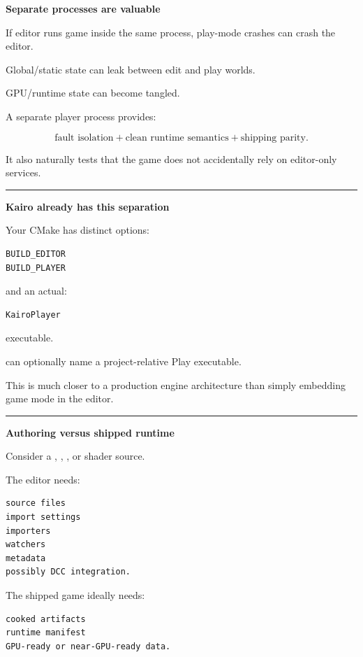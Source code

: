 \textbf{Separate processes are valuable}

If editor runs game inside the same process, play-mode crashes can crash the editor.

Global/static state can leak between edit and play worlds.

GPU/runtime state can become tangled.

A separate player process provides:

\[
\boxed{
\text{fault isolation}
+
\text{clean runtime semantics}
+
\text{shipping parity}.
}
\]

It also naturally tests that the game does not accidentally rely on editor-only services.

\begin{center}\rule{0.5\linewidth}{0.5pt}\end{center}

\textbf{Kairo already has this separation}

Your CMake has distinct options:

\begin{verbatim}
BUILD_EDITOR
BUILD_PLAYER
\end{verbatim}

and an actual:

\begin{verbatim}
KairoPlayer
\end{verbatim}

executable.

 can optionally name a project-relative Play executable.

This is much closer to a production engine architecture than simply embedding game mode in the editor.

\begin{center}\rule{0.5\linewidth}{0.5pt}\end{center}

\textbf{Authoring versus shipped runtime}

Consider a , , , or shader source.

The editor needs:

\begin{verbatim}
source files
import settings
importers
watchers
metadata
possibly DCC integration.
\end{verbatim}

The shipped game ideally needs:

\begin{verbatim}
cooked artifacts
runtime manifest
GPU-ready or near-GPU-ready data.
\end{verbatim}


